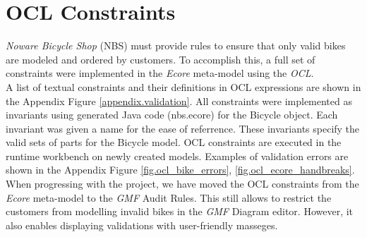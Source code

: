 \section{OCL Constraints}
\label{sec.ocl_constraints}

\noindent 
\emph{Noware Bicycle Shop} (NBS) must provide rules to ensure that
only valid bikes are modeled and ordered by customers. To accomplish this, a full
set of constraints were implemented in the \emph{Ecore} meta-model using the
\emph{OCL}.\\

\noindent
A list of textual constraints and their definitions in OCL expressions are shown
in the Appendix Figure \ref{appendix.validation}. All constraints were implemented as invariants using
generated Java code (nbs.ecore) for the Bicycle object. Each invariant was given
a name for the ease of referrence. These invariants specify the valid sets
of parts for the Bicycle model. OCL constraints are executed in the runtime
workbench on newly created models. Examples of validation errors are shown in the Appendix Figure
\ref{fig.ocl_bike_errors}, \ref{fig.ocl_ecore_handbreaks}.\\

\noindent 
When progressing with the project, we have moved the OCL constraints from the
\emph{Ecore} meta-model to the \emph{GMF} Audit Rules. This still allows to
restrict the customers from modelling invalid bikes in the \emph{GMF} Diagram
editor. However, it also enables displaying validations with user-friendly
masseges.


